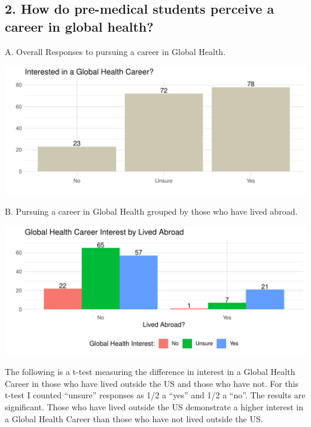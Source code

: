 \documentclass[
  letterpaper,
  DIV=11,
  numbers=noendperiod]{scrartcl}
\begin{document}
\newpage

\hypertarget{how-do-pre-medical-students-perceive-a-career-in-global-health}{%
\subsection{2. How do pre-medical students perceive a career in global
health?}\label{how-do-pre-medical-students-perceive-a-career-in-global-health}}

A. Overall Responses to pursuing a career in Global Health.

\includegraphics{GlobalHealthQuarto1-5_files/figure-pdf/unnamed-chunk-12-1.pdf}

\newpage

B. Pursuing a career in Global Health grouped by those who have lived
abroad.

\includegraphics{GlobalHealthQuarto1-5_files/figure-pdf/unnamed-chunk-13-1.pdf}

\newpage

The following is a t-test measuring the difference in interest in a
Global Health Career in those who have lived outside the US and those
who have not. For this t-test I counted ``unsure'' responses as 1/2 a
``yes'' and 1/2 a ``no''. The results are significant. Those who have
lived outside the US demonstrate a higher interest in a Global Health
Career than those who have not lived outside the US.
\end{document}
